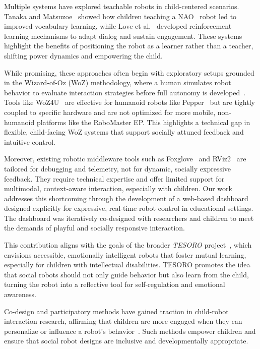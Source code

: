 \documentclass[a4paper]{usiinfbachelorproject}
\begin{document}
Multiple systems have explored teachable robots in child-centered scenarios.
Tanaka and Matsuzoe~\cite{10.5898/JHRI.1.1.Tanaka} showed how children teaching a NAO~\cite{nao_robot} robot led to improved vocabulary learning, while Love et al.~\cite{love2023adapting, love2024teachable} developed reinforcement learning mechanisms to adapt dialog and sustain engagement.
These systems highlight the benefits of positioning the robot as a learner rather than a teacher, shifting power dynamics and empowering the child.

While promising, these approaches often begin with exploratory setups grounded in the Wizard-of-Oz (WoZ) methodology, where a human simulates robot behavior to evaluate interaction strategies before full autonomy is developed~\cite{weiss2010userWOZ, rietz2021woz4uPepper, SCHOONDERWOERD2022102831}.
Tools like WoZ4U~\cite{rietz2021woz4uPepper} are effective for humanoid robots like Pepper~\cite{pepper_robot} but are tightly coupled to specific hardware and are not optimized for more mobile, non-humanoid platforms like the RoboMaster EP.
This highlights a technical gap in flexible, child-facing WoZ systems that support socially attuned feedback and intuitive control.

Moreover, existing robotic middleware tools such as Foxglove~\cite{foxglove} and RViz2~\cite{rviz2} are tailored for debugging and telemetry, not for dynamic, socially expressive feedback.
They require technical expertise and offer limited support for multimodal, context-aware interaction, especially with children.
Our work addresses this shortcoming through the development of a web-based dashboard designed explicitly for expressive, real-time robot control in educational settings.
The dashboard was iteratively co-designed with researchers and children to meet the demands of playful and socially responsive interaction.

This contribution aligns with the goals of the broader \textit{TESORO} project~\cite{landoni2025tesoro}, which envisions accessible, emotionally intelligent robots that foster mutual learning, especially for children with intellectual disabilities.
TESORO promotes the idea that social robots should not only guide behavior but also learn from the child, turning the robot into a reflective tool for self-regulation and emotional awareness.

Co-design and participatory methods have gained traction in child-robot interaction research, affirming that children are more engaged when they can personalize or influence a robot's behavior~\cite{osti_10386132, rose2019participatory}.
Such methods empower children and ensure that social robot designs are inclusive and developmentally appropriate.
\end{document}
